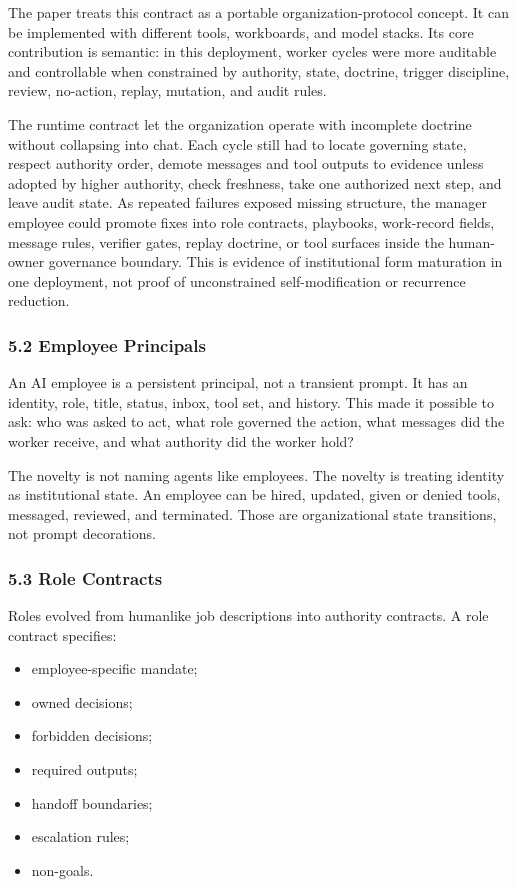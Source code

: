 \documentclass[
]{article}
\providecommand{\tightlist}{%
  \setlength{\itemsep}{0pt}\setlength{\parskip}{0pt}}
\begin{document}
The paper treats this contract as a portable organization-protocol concept. It can be implemented with different tools, workboards, and model stacks. Its core contribution is semantic: in this deployment, worker cycles were more auditable and controllable when constrained by authority, state, doctrine, trigger discipline, review, no-action, replay, mutation, and audit rules.

The runtime contract let the organization operate with incomplete doctrine without collapsing into chat. Each cycle still had to locate governing state, respect authority order, demote messages and tool outputs to evidence unless adopted by higher authority, check freshness, take one authorized next step, and leave audit state. As repeated failures exposed missing structure, the manager employee could promote fixes into role contracts, playbooks, work-record fields, message rules, verifier gates, replay doctrine, or tool surfaces inside the human-owner governance boundary. This is evidence of institutional form maturation in one deployment, not proof of unconstrained self-modification or recurrence reduction.

\subsubsection{5.2 Employee Principals}\label{employee-principals}

An AI employee is a persistent principal, not a transient prompt. It has an identity, role, title, status, inbox, tool set, and history. This made it possible to ask: who was asked to act, what role governed the action, what messages did the worker receive, and what authority did the worker hold?

The novelty is not naming agents like employees. The novelty is treating identity as institutional state. An employee can be hired, updated, given or denied tools, messaged, reviewed, and terminated. Those are organizational state transitions, not prompt decorations.

\subsubsection{5.3 Role Contracts}\label{role-contracts}

Roles evolved from humanlike job descriptions into authority contracts. A role contract specifies:

\begin{itemize}
\tightlist
\item
  employee-specific mandate;
\item
  owned decisions;
\item
  forbidden decisions;
\item
  required outputs;
\item
  handoff boundaries;
\item
  escalation rules;
\item
  non-goals.
\end{itemize}
\end{document}
